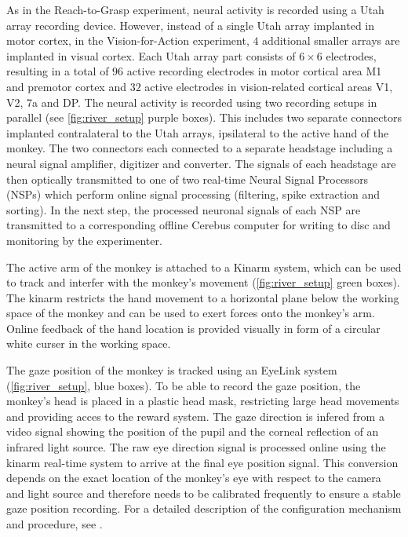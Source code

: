 As in the Reach-to-Grasp experiment, neural activity is recorded using a Utah array recording device. However, instead of a single Utah array implanted in motor cortex, in the Vision-for-Action experiment, $4$ additional smaller arrays are implanted in visual cortex. Each Utah array part consists of $6\times6$ electrodes, resulting in a total of $96$ active recording electrodes in motor cortical area M1 and premotor cortex and $32$  active electrodes in vision-related cortical areas V1, V2, 7a and DP. The neural activity is recorded using two recording setups in parallel (see \cref{fig:river_setup} purple boxes). This includes two separate connectors implanted contralateral to the Utah arrays, ipsilateral to the active hand of the monkey. The two connectors each connected to a separate headstage including a neural signal amplifier, digitizer and converter. The signals of each headstage are then optically transmitted to one of two real-time Neural Signal Processors (NSPs) which perform online signal processing (filtering, spike extraction and sorting). In the next step, the processed neuronal signals of each NSP are transmitted to a corresponding offline Cerebus computer for writing to disc and monitoring by the experimenter.

The active arm of the monkey is attached to a Kinarm system, which can be used to track and interfer with the monkey's movement (\cref{fig:river_setup} green boxes). The kinarm restricts the hand movement to a horizontal plane below the working space of the monkey and can be used to exert forces onto the monkey's arm. Online feedback of the hand location is provided visually in form of a circular white curser in the working space.

The gaze position of the monkey is tracked using an EyeLink system (\cref{fig:river_setup}, blue boxes). To be able to record the gaze position, the monkey's head is placed in a plastic head mask, restricting large head movements and providing acces to the reward system. The gaze direction is infered from a video signal showing the position of the pupil and the corneal reflection of an infrared light source. The raw eye direction signal is processed online using the kinarm real-time system to arrive at the final eye position signal. This conversion depends on the exact location of the monkey's eye with respect to the camera and light source and therefore needs to be calibrated frequently to ensure a stable gaze position recording. For a detailed description of the configuration mechanism and procedure, see \citet{deHaan_2018}.

